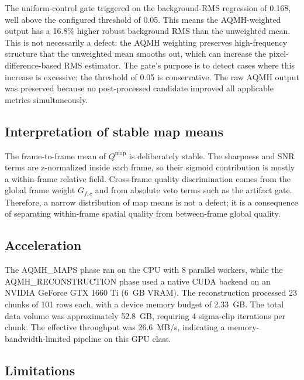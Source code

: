 \documentclass[10pt,twocolumn]{article}
\begin{document}
The uniform-control gate triggered on the background-RMS regression of \num{0.168}, well above
the configured threshold of \num{0.05}. This means the AQMH-weighted output has a \num{16.8}\%
higher robust background RMS than the unweighted mean. This is not necessarily a defect: the
AQMH weighting preserves high-frequency structure that the unweighted mean smooths out, which can
increase the pixel-difference-based RMS estimator. The gate's purpose is to detect cases where
this increase is excessive; the threshold of \num{0.05} is conservative. The raw AQMH output was
preserved because no post-processed candidate improved all applicable metrics simultaneously.

\subsection{Interpretation of stable map means}

The frame-to-frame mean of $Q^{\mathrm{map}}$ is deliberately stable. The sharpness and SNR terms
are z-normalized inside each frame, so their sigmoid contribution is mostly a within-frame
relative field. Cross-frame quality discrimination comes from the global frame weight $G_{f,c}$
and from absolute veto terms such as the artifact gate. Therefore, a narrow distribution of map
means is not a defect; it is a consequence of separating within-frame spatial quality from
between-frame global quality.

\subsection{Acceleration}

The AQMH\_MAPS phase ran on the CPU with 8 parallel workers, while the AQMH\_RECONSTRUCTION phase
used a native CUDA backend on an NVIDIA GeForce GTX 1660 Ti (\SI{6}{GB} VRAM). The reconstruction
processed \num{23} chunks of \num{101} rows each, with a device memory budget of
\SI{2.33}{GB}. The total data volume was approximately \SI{52.8}{GB}, requiring
\num{4} sigma-clip iterations per chunk. The effective throughput was \SI{26.6}{MB/s}, indicating
a memory-bandwidth-limited pipeline on this GPU class.

\subsection{Limitations}
\end{document}
